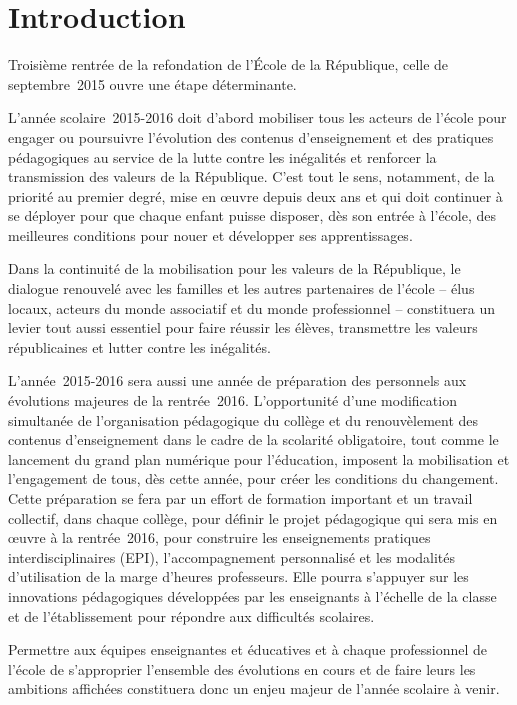 \section*{Introduction}
Troisième rentrée de la refondation de l’École de la République, celle de septembre~2015 ouvre une étape déterminante.

L’année scolaire~2015-2016 doit d’abord mobiliser tous les acteurs de l’école pour engager ou poursuivre l’évolution des contenus d’enseignement et des pratiques pédagogiques au service de la lutte contre les inégalités et renforcer la transmission des valeurs de la République. C’est tout le sens, notamment, de la priorité au premier degré, mise en œuvre depuis deux ans et qui doit continuer à se déployer pour que chaque enfant puisse disposer, dès son entrée à l’école, des meilleures conditions pour nouer et développer ses apprentissages.

Dans la continuité de la mobilisation pour les valeurs de la République, le dialogue renouvelé avec les familles et les autres partenaires de l’école -- élus locaux, acteurs du monde associatif et du monde professionnel -- constituera un levier tout aussi essentiel pour faire réussir les élèves, transmettre les valeurs républicaines et lutter contre les inégalités.

L’année~2015-2016 sera aussi une année de préparation des personnels aux évolutions majeures de la rentrée~2016. L’opportunité d’une modification simultanée de l’organisation pédagogique du collège et du renouvèlement des contenus d’enseignement dans le cadre de la scolarité obligatoire, tout comme le lancement du grand plan numérique pour l’éducation, imposent la mobilisation et l’engagement de tous, dès cette année, pour créer les conditions du changement. Cette préparation se fera par un effort de formation important et un travail collectif, dans chaque collège, pour définir le projet pédagogique qui sera mis en œuvre à la rentrée~2016, pour construire les enseignements pratiques interdisciplinaires (EPI), l’accompagnement personnalisé et les modalités d’utilisation de la marge d’heures professeurs. Elle pourra s’appuyer sur les innovations pédagogiques développées par les enseignants à l’échelle de la classe et de l’établissement pour répondre aux difficultés scolaires.

Permettre aux équipes enseignantes et éducatives et à chaque professionnel de l’école de s’approprier l’ensemble des évolutions en cours et de faire leurs les ambitions affichées constituera donc un enjeu majeur de l’année scolaire à venir.

